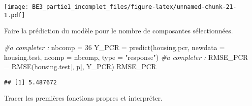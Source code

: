 \documentclass[
]{article}
\newenvironment{Shaded}{\begin{snugshade}}{\end{snugshade}}
\newcommand{\AttributeTok}[1]{\textcolor[rgb]{0.77,0.63,0.00}{#1}}
\newcommand{\CommentTok}[1]{\textcolor[rgb]{0.56,0.35,0.01}{\textit{#1}}}
\newcommand{\DecValTok}[1]{\textcolor[rgb]{0.00,0.00,0.81}{#1}}
\newcommand{\FunctionTok}[1]{\textcolor[rgb]{0.00,0.00,0.00}{#1}}
\newcommand{\NormalTok}[1]{#1}
\newcommand{\OtherTok}[1]{\textcolor[rgb]{0.56,0.35,0.01}{#1}}
\newcommand{\StringTok}[1]{\textcolor[rgb]{0.31,0.60,0.02}{#1}}
\begin{document}
\texttt{[image: BE3\_partie1\_incomplet\_files/figure-latex/unnamed-chunk-21-1.pdf]}

Faire la prédiction du modèle pour le nombre de composantes
sélectionnées.

\begin{Shaded}
\begin{Highlighting}[]
\CommentTok{\#a completer :}
\NormalTok{nbcomp }\OtherTok{=} \DecValTok{36}
\NormalTok{Y\_PCR }\OtherTok{=} \FunctionTok{predict}\NormalTok{(housing.pcr, }\AttributeTok{newdata =}\NormalTok{ housing.test, }\AttributeTok{ncomp =}\NormalTok{ nbcomp, }\AttributeTok{type =} \StringTok{"response"}\NormalTok{)}
\CommentTok{\#a completer :}
\NormalTok{RMSE\_PCR }\OtherTok{=} \FunctionTok{RMSE}\NormalTok{(housing.test[, p], Y\_PCR)}
\NormalTok{RMSE\_PCR}
\end{Highlighting}
\end{Shaded}

\begin{verbatim}
## [1] 5.487672
\end{verbatim}

Tracer les premières fonctions propres et interpréter.
\end{document}
